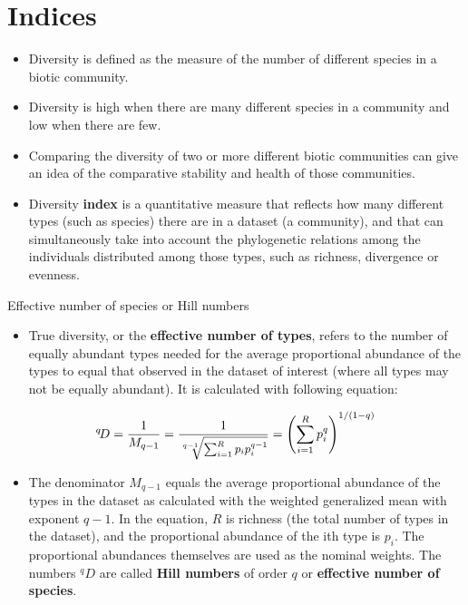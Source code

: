 \documentclass[
  ignorenonframetext,
  aspectratio=169]{beamer}
\providecommand{\tightlist}{%
  \setlength{\itemsep}{0pt}\setlength{\parskip}{0pt}}
\begin{document}
\hypertarget{indices}{%
\section{Indices}\label{indices}}

\begin{frame}{}
\protect\hypertarget{section-3}{}
\begin{itemize}
\tightlist
\item
  Diversity is defined as the measure of the number of different species
  in a biotic community.
\item
  Diversity is high when there are many different species in a community
  and low when there are few.
\item
  Comparing the diversity of two or more different biotic communities
  can give an idea of the comparative stability and health of those
  communities.
\item
  Diversity \textbf{index} is a quantitative measure that reflects how
  many different types (such as species) there are in a dataset (a
  community), and that can simultaneously take into account the
  phylogenetic relations among the individuals distributed among those
  types, such as richness, divergence or evenness.
\end{itemize}
\end{frame}

\begin{frame}{Effective number of species or Hill numbers}
\protect\hypertarget{effective-number-of-species-or-hill-numbers}{}
\small

\begin{itemize}
\tightlist
\item
  True diversity, or the \textbf{effective number of types}, refers to
  the number of equally abundant types needed for the average
  proportional abundance of the types to equal that observed in the
  dataset of interest (where all types may not be equally abundant). It
  is calculated with following equation:
\end{itemize}

\[
\small
{}^{q}\!D={1 \over M_{q-1}}={1 \over {\sqrt[{q-1}]{\sum _{i=1}^{R}p_{i}p_{i}^{q-1}}}}=\left({\sum _{i=1}^{R}p_{i}^{q}}\right)^{1/(1-q)}
\]

\begin{itemize}
\tightlist
\item
  The denominator \(M_{q-1}\) equals the average proportional abundance
  of the types in the dataset as calculated with the weighted
  generalized mean with exponent \(q-1\). In the equation, \(R\) is
  richness (the total number of types in the dataset), and the
  proportional abundance of the ith type is \(p_i\). The proportional
  abundances themselves are used as the nominal weights. The numbers
  \({\displaystyle ^{q}D}\) are called \textbf{Hill numbers} of order
  \(q\) or \textbf{effective number of species}.
\end{itemize}
\end{frame}
\end{document}
